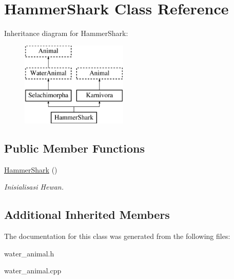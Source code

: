\hypertarget{class_hammer_shark}{}\section{Hammer\+Shark Class Reference}
\label{class_hammer_shark}
Inheritance diagram for Hammer\+Shark\+:\begin{figure}[H]
\begin{center}
\leavevmode
\includegraphics[height=4.000000cm]{class_hammer_shark}
\end{center}
\end{figure}
\subsection*{Public Member Functions}
\begin{DoxyCompactItemize}
\item 
\hyperlink{class_hammer_shark_aaab0fb1ad98b4a782e311c378df2c250}{Hammer\+Shark} ()\hypertarget{class_hammer_shark_aaab0fb1ad98b4a782e311c378df2c250}{}\label{class_hammer_shark_aaab0fb1ad98b4a782e311c378df2c250}

\begin{DoxyCompactList}\small\item\em Inisialisasi Hewan. \end{DoxyCompactList}\end{DoxyCompactItemize}
\subsection*{Additional Inherited Members}


The documentation for this class was generated from the following files\+:\begin{DoxyCompactItemize}
\item 
water\+\_\+animal.\+h\item 
water\+\_\+animal.\+cpp\end{DoxyCompactItemize}
